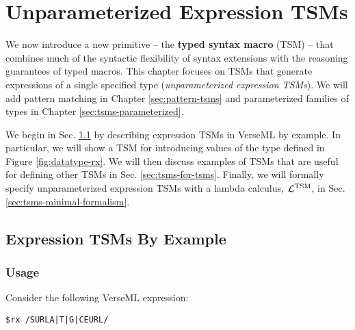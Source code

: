 \chapter{Unparameterized Expression TSMs}\label{chap:tsms}
We now introduce a new primitive -- the \textbf{typed syntax macro} (TSM) -- that combines much of the syntactic flexibility of syntax extensions with the reasoning guarantees of typed macros. This chapter focuses on TSMs that generate expressions of a single specified type (\emph{unparameterized expression TSMs}). We will add pattern matching in Chapter \ref{sec:pattern-tsms} and parameterized families of types in Chapter \ref{sec:tsms-parameterized}.

We begin in Sec. \ref{sec:tsms-by-example} by describing expression TSMs in VerseML by example.  In particular, we will show a TSM for introducing values of the type  defined in Figure \ref{fig:datatype-rx}. We will then discuss examples of TSMs that are useful for defining other TSMs in Sec. \ref{sec:tsms-for-tsms}. Finally, we will formally specify unparameterized expression TSMs with a lambda calculus, $\mathcal{L}^\text{TSM}$, in Sec. \ref{sec:tsms-minimal-formalism}.%



\section{Expression TSMs By Example}\label{sec:tsms-by-example}

\subsection{Usage}\label{sec:uetsms-usage}
Consider the following VerseML expression:
\begin{lstlisting}[numbers=none,mathescape=|]
$rx /SURLA|T|G|CEURL/
\end{lstlisting}


